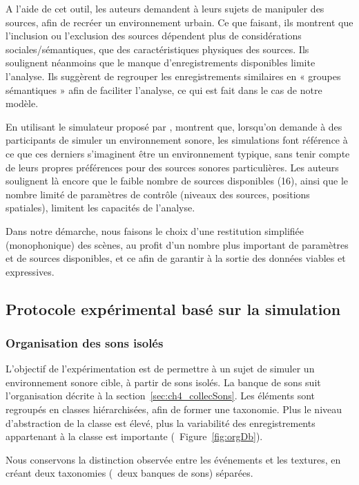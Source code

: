 A l'aide de cet outil, les auteurs demandent à leurs sujets de manipuler des sources, afin de recréer un environnement urbain. Ce que faisant, ils montrent que l'inclusion ou l'exclusion des sources dépendent plus de considérations sociales/sémantiques, que des caractéristiques physiques des sources. Ils soulignent néanmoins que le manque d'enregistrements disponibles limite l'analyse. Ils suggèrent de regrouper les enregistrements similaires en « groupes sémantiques » afin de faciliter l'analyse, ce qui est fait dans le cas de notre modèle. 

En utilisant le simulateur proposé par \citep{bruce2009development}, \citep{davies2014soundscape} montrent que, lorsqu'on demande à des participants de simuler un environnement sonore, les simulations font référence à ce que ces derniers s'imaginent être un environnement typique, sans tenir compte de leurs propres préférences pour des sources sonores particulières. Les auteurs soulignent là encore que le faible nombre de sources disponibles (16), ainsi que le nombre limité de paramètres de contrôle (niveaux des sources, positions spatiales), limitent les capacités de l'analyse.

Dans notre démarche, nous faisons le choix d'une restitution simplifiée (monophonique) des scènes, au profit d'un nombre plus important de paramètres et de sources disponibles, et ce afin de garantir à la sortie des données viables et expressives.

\subsection{Protocole expérimental basé sur la simulation}

\subsubsection{Organisation des sons isolés}
\label{sec:ch4_dbEventTexture}

L'objectif de l'expérimentation est de permettre à un sujet de simuler un environnement sonore cible, à partir de sons isolés. La banque de sons suit l'organisation décrite à la section~\ref{sec:ch4_collecSons}. Les éléments sont regroupés en classes hiérarchisées, afin de former une taxonomie. Plus le niveau d'abstraction de la classe est élevé, plus la variabilité des enregistrements appartenant à la classe est importante (\cf~Figure~\ref{fig:orgDb}).
 
Nous conservons la distinction observée entre les événements et les textures, en créant deux taxonomies (\ie~deux banques de sons) séparées.

